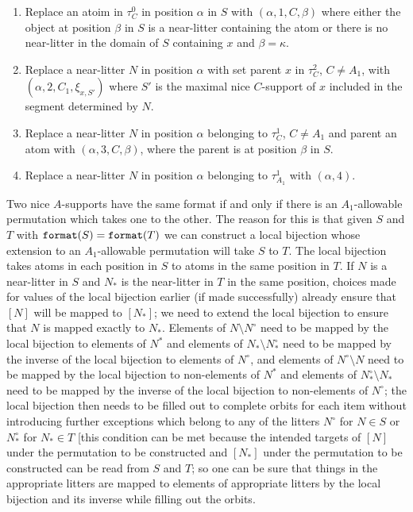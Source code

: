\documentclass[12pt]{article}
\begin{document}
\begin{enumerate}

\item Replace an atoim in $\tau^0_C$ in position $\alpha$ in $S$ with $(\alpha,1,C,\beta)$ where either the object at position $\beta$ in $S$ is
a near-litter containing the atom or there is no near-litter in the domain of $S$ containing $x$ and $\beta=\kappa$.

\item Replace a near-litter $N$ in position $\alpha$  with set parent $x$ in $\tau^2_C$, $C \neq A_1$, with $(\alpha,2,C_1,\xi_{x,S'})$ where $S'$ is the maximal nice $C$-support of $x$ included in the segment determined by $N$.

\item Replace a near-litter $N$ in position $\alpha$ belonging to $\tau^1_C$, $C \neq A_1$ and parent an atom with $(\alpha,3,C,\beta)$, where the parent is at position $\beta$ in $S$.

\item Replace a near-litter $N$ in position $\alpha$ belonging to $\tau^1_{A_1}$ with $(\alpha,4)$.

\end{enumerate}

Two nice $A$-supports have the same format if and only if there is an $A_1$-allowable permutation which takes one to the other.  The reason for this is that given
$S$ and $T$ with ${\tt format}(S)={\tt format}(T)$ we can construct a local bijection whose extension to an $A_1$-allowable permutation will take $S$ to $T$.
The local bijection takes atoms in each position in $S$ to atoms in the same position in $T$.  If $N$ is a near-litter in $S$ and $N_*$ is the near-litter in $T$ in the same position,
choices made for values of the local bijection earlier (if made successfully) already ensure that $[N]$ will be mapped to $[N_*]$;  we need to extend the local bijection
to ensure that $N$ is mapped exactly to $N_*$.  Elements of $N \setminus N^{\circ}$ need to be mapped by the local bijection to elements of $N^*$ and elements
of $N_* \setminus N_*^{\circ}$ need to be mapped by the inverse of the local bijection to elements of $N^{\circ}$, and elements of $N^{\circ}\setminus N$ need to be mapped by the local bijection to non-elements of $N^*$ and elements
of $N_*^{\circ}\setminus N_*$ need to be mapped by the inverse of the local bijection to non-elements of $N^{\circ}$;  the local bijection then needs to be filled out to complete orbits
for each item without introducing further exceptions which belong to any of the litters $N^{\circ}$ for $N \in S$ or $N^{\circ}_*$ for $N_* \in T$ [this condition can be met because the
intended targets of $[N]$ under the permutation to be constructed and $[N_*]$ under the permutation to be constructed can be read from $S$ and $T$;  so one can be sure that things
in the appropriate litters are mapped to elements of appropriate litters by the local bijection and its inverse while filling out the orbits.
\end{document}
